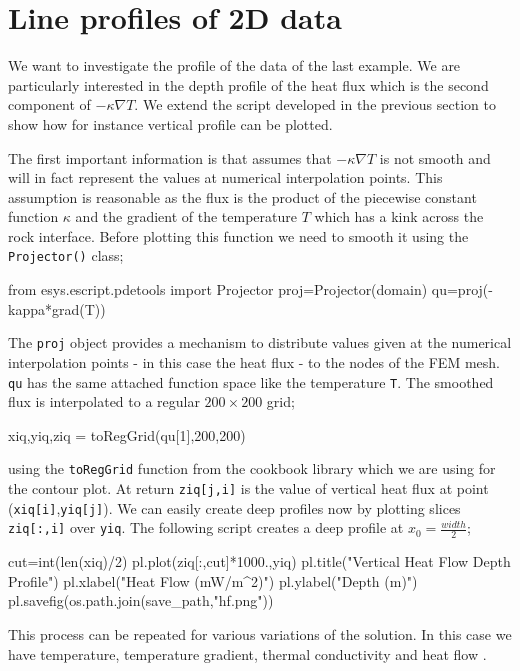 \section{Line profiles of 2D data}

We want to investigate the profile of the data of the last example. 
We are particularly interested in the depth profile of the heat flux which is
the second component of $-\kappa \nabla T$. We extend the script developed in the 
previous section to show how for instance vertical profile can be plotted.

The first important information is that \esc assumes that $-\kappa \nabla T$ is not smooth and
will in fact represent the values at numerical interpolation points. This assumption is reasonable as
the flux is the product of the piecewise constant function $\kappa$ and 
the gradient of the temperature $T$ which has a kink across the rock interface. 
Before plotting this function we need to smooth it using the 
\verb|Projector()| class;
\begin{python}
from esys.escript.pdetools import Projector
proj=Projector(domain)
qu=proj(-kappa*grad(T))
\end{python}
The \verb|proj| object provides a mechanism to distribute values given at the numerical interpolation points
- in this case the heat flux - to the nodes of the FEM mesh. \verb|qu| has the same attached function space
like the temperature \verb|T|. The smoothed flux is interpolated 
to a regular $200\times 200$ grid;
\begin{python}
xiq,yiq,ziq = toRegGrid(qu[1],200,200)
\end{python}
using the \verb|toRegGrid| function from the cookbook library which we are using for the contour plot.
At return \verb|ziq[j,i]| is the value of vertical heat flux at point 
(\verb|xiq[i]|,\verb|yiq[j]|). We can easily create deep profiles now by
plotting slices \verb|ziq[:,i]| over \verb|yiq|. The following script
creates a deep profile at $x_{0}=\frac{width}{2}$;
\begin{python}
cut=int(len(xiq)/2)
pl.plot(ziq[:,cut]*1000.,yiq)
pl.title("Vertical Heat Flow Depth Profile")
pl.xlabel("Heat Flow (mW/m^2)")
pl.ylabel("Depth (m)")
pl.savefig(os.path.join(save_path,"hf.png"))
\end{python}
This process can be repeated for various variations of the solution. In this case we have temperature, temperature gradient, thermal conductivity and heat flow .

